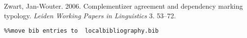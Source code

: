 \documentclass[output=paper]{langsci/langscibook}
\begin{document}
\begin{styleSfondomedioiColorexxi}
Zwart, Jan-Wouter. 2006. Complementizer agreement and dependency marking typology. \textit{Leiden Working Papers in Linguistics} 3. 53–72.
\end{styleSfondomedioiColorexxi}


\begin{verbatim}%%move bib entries to  localbibliography.bib
\end{verbatim} 

\sloppy
\printbibliography[heading=subbibliography,notkeyword=this] 
\end{document}
